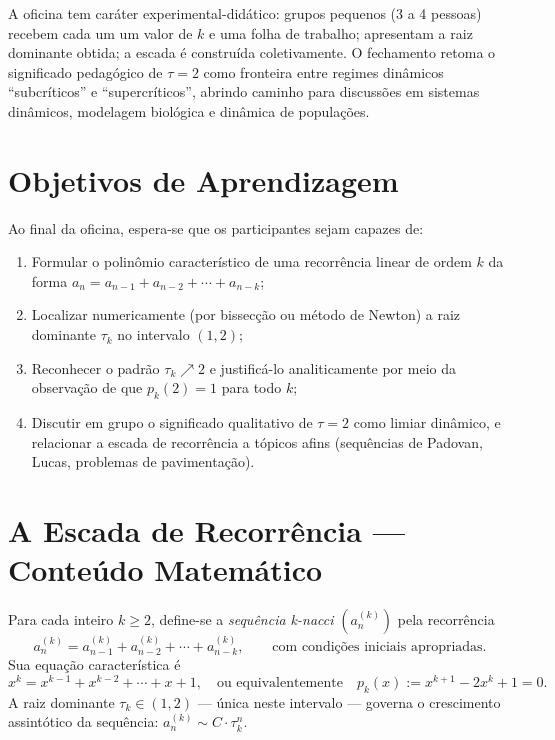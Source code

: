 \documentclass[11pt,a4paper]{article}
\begin{document}
A oficina tem caráter experimental-didático: grupos pequenos (3 a 4 pessoas) recebem cada um um valor de $k$ e uma folha de trabalho; apresentam a raiz dominante obtida; a escada é construída coletivamente. O fechamento retoma o significado pedagógico de $\tau = 2$ como fronteira entre regimes dinâmicos ``subcríticos'' e ``supercríticos'', abrindo caminho para discussões em sistemas dinâmicos, modelagem biológica e dinâmica de populações.

\section*{Objetivos de Aprendizagem}

Ao final da oficina, espera-se que os participantes sejam capazes de:

\begin{enumerate}[leftmargin=2em,itemsep=0.2em]
  \item Formular o polinômio característico de uma recorrência linear de ordem $k$ da forma $a_{n} = a_{n-1} + a_{n-2} + \cdots + a_{n-k}$;
  \item Localizar numericamente (por bissecção ou método de Newton) a raiz dominante $\tau_k$ no intervalo $(1, 2)$;
  \item Reconhecer o padrão $\tau_k \nearrow 2$ e justificá-lo analiticamente por meio da observação de que $p_k(2) = 1$ para todo $k$;
  \item Discutir em grupo o significado qualitativo de $\tau = 2$ como limiar dinâmico, e relacionar a escada de recorrência a tópicos afins (sequências de Padovan, Lucas, problemas de pavimentação).
\end{enumerate}

\section*{A Escada de Recorrência --- Conteúdo Matemático}

Para cada inteiro $k \geq 2$, define-se a \emph{sequência k-nacci} $(a_n^{(k)})$ pela recorrência
\[
a_n^{(k)} = a_{n-1}^{(k)} + a_{n-2}^{(k)} + \cdots + a_{n-k}^{(k)},
\qquad \text{com condições iniciais apropriadas.}
\]
Sua equação característica é
\[
x^k = x^{k-1} + x^{k-2} + \cdots + x + 1,
\quad \text{ou equivalentemente} \quad
p_k(x) := x^{k+1} - 2x^{k} + 1 = 0.
\]
A raiz dominante $\tau_k \in (1, 2)$ --- única neste intervalo --- governa o crescimento assintótico da sequência: $a_n^{(k)} \sim C \cdot \tau_k^n$.
\end{document}
